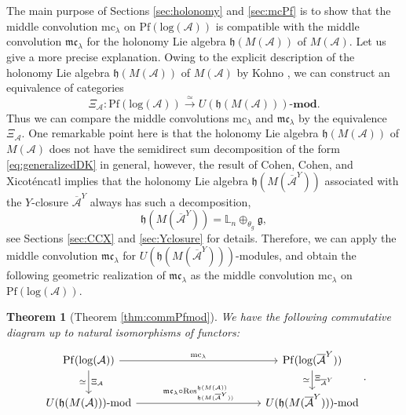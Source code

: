 \documentclass[a4paper,12pt]{article}
\newtheorem{thm}{Theorem}[section]
\theoremstyle{definition}
\theoremstyle{remark}
\begin{document}
The main purpose of Sections \ref{sec:holonomy} and \ref{sec:mcPf}
is to show that the middle convolution $\mathrm{mc}_{\lambda}$ on 
$\mathrm{Pf}(\mathrm{log}(\mathcal{A}))$ 
is compatible with the middle convolution $\mathfrak{mc}_{\lambda}$ for 
the holonomy Lie algebra $\mathfrak{h}(M(\mathcal{A}))$ of $M(\mathcal{A})$.
Let us give a more precise explanation.
Owing to the explicit description of  
the holonomy Lie algebra $\mathfrak{h}(M(\mathcal{A}))$ of $M(\mathcal{A})$
by Kohno \cite{Koh83},
we can construct an equivalence of categories
\[
	\Xi_{\mathcal{A}}\colon \mathrm{Pf}(\mathrm{log}(\mathcal{A}))
	\xrightarrow{\simeq} U(\mathfrak{h}(M(\mathcal{A})))\text{-}\mathbf{mod}.
\]
Thus we can compare the middle convolutions $\mathrm{mc}_{\lambda}$
and $\mathfrak{mc}_{\lambda}$ by the equivalence $\Xi_{\mathcal{A}}$.
One remarkable point here is that 
the holonomy Lie algebra $\mathfrak{h}(M(\mathcal{A}))$ of $M(\mathcal{A})$ 
does not have the semidirect sum decomposition of the form 
\eqref{eq:generalizedDK} in general, 
however, the result of Cohen, Cohen, and Xicot\'encatl \cite{CCX03} implies 
that the holonomy Lie algebra $\mathfrak{h}(M(\overline{\mathcal{A}}^{Y}))$ 
associated with the $Y$-closure $\overline{\mathcal{A}}^{Y}$
always has such a decomposition,
\[	
	\mathfrak{h}(M(\overline{\mathcal{A}}^{Y}))=
	\mathbb{L}_{n}\oplus_{\theta_{g}} \mathfrak{g},
\]
see Sections \ref{sec:CCX} and \ref{sec:Yclosure} for details.
Therefore, we can apply the middle convolution 
$\mathfrak{mc}_{\lambda}$ for $U(\mathfrak{h}(M(\overline{\mathcal{A}}^{Y})))$-modules,
and obtain the following  geometric realization of 
$\mathfrak{mc}_{\lambda}$ as the middle convolution $\mathrm{mc}_{\lambda}$ 
on $\mathrm{Pf}(\mathrm{log}(\mathcal{A}))$.
\begin{thm}[Theorem \ref{thm:commPfmod}]
We have the following commutative diagram
up to natural isomorphisms of functors:
\[\begin{tikzcd}[column sep=4cm]
\mathrm{Pf}(\mathrm{log}(\mathcal{A}))\arrow[r,"\mathrm{mc}_{\lambda}"]\arrow[d,"\simeq"',"\Xi_{\mathcal{A}}"]&
\mathrm{Pf}(\mathrm{log}(\overline{\mathcal{A}}^{Y}))\arrow[d,"\simeq"', "\Xi_{\overline{\mathcal{A}}^{Y}}"]\\
U(\mathfrak{h}(M(\mathcal{A})))\text{-}\mathrm{mod}\arrow[r,"\mathfrak{mc}_{\lambda}\circ \mathrm{Res}_{\mathfrak{h}(M(\overline{\mathcal{A}}^{Y}))}^{\mathfrak{h}(M(\mathcal{A}))}"]&
U(\mathfrak{h}(M(\overline{\mathcal{A}}^{Y})))\text{-}\mathrm{mod}
\end{tikzcd}.
\]
\end{thm}
\end{document}
